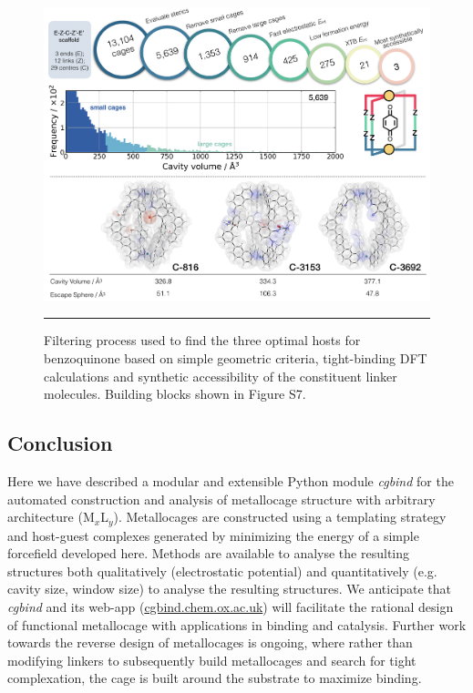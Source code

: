 \documentclass[../../main.tex]{subfiles}
\newcommand{\cgbind}{\emph{cgbind }}
\begin{document}
\begin{figure}[h!]
	\vspace{0.4cm}
	\centering
	\includegraphics[width=\textwidth]{3/cgbind/figs/fig8}
	\vspace{0.2cm}
	\hrule
	\caption{Filtering process used to find the three optimal hosts for benzoquinone based on simple geometric criteria, tight-binding DFT calculations and synthetic accessibility of the constituent linker molecules. Building blocks shown in Figure S7.}
	\label{fig::cg_8}
\end{figure}

\clearpage

\subsection{Conclusion}

Here we have described a modular and extensible Python module \cgbind for the automated construction and analysis of metallocage structure with arbitrary architecture (M$_x$L$_y$). Metallocages are constructed using a templating strategy and host-guest complexes generated by minimizing the energy of a simple forcefield developed here. Methods are available to analyse the resulting structures both qualitatively (electrostatic potential) and quantitatively (e.g. cavity size, window size) to analyse the resulting structures. We anticipate that \cgbind and its web-app ({\url{cgbind.chem.ox.ac.uk}}) will facilitate the rational design of functional metallocage with applications in binding and catalysis. Further work towards the reverse design of metallocages is ongoing, where rather than modifying linkers to subsequently build metallocages and search for tight complexation, the cage is built around the substrate to maximize binding.
\end{document}
